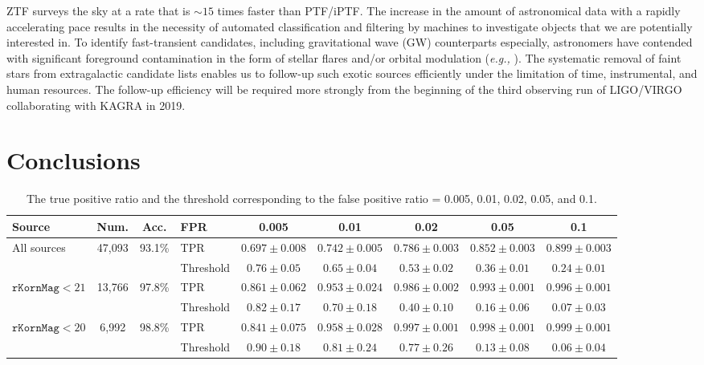 \documentclass[twocolumn]{aastex62}
\begin{document}
ZTF surveys the sky at a rate that is $\sim15$ times faster than PTF/iPTF. 
The increase in the amount of astronomical data with a rapidly accelerating pace 
results in the necessity of automated classification and filtering by machines to investigate objects 
that we are potentially interested in. 
To identify fast-transient candidates, including gravitational wave (GW) counterparts especially, 
astronomers have contended with significant foreground contamination in the form of stellar flares 
and/or orbital modulation ({\it e.g.,} \citealt{Kulkarni06, Berger12, Kasliwal16}). 
The systematic removal of faint stars from extragalactic candidate lists 
enables us to follow-up such exotic sources efficiently under the limitation of time, instrumental, and human resources. 
The follow-up efficiency will be required more strongly from the beginning of the third observing run of LIGO/VIRGO 
collaborating with KAGRA in 2019. 


\section{Conclusions}

\begin{table}
\begin{center}
\caption{The true positive ratio and the threshold 
corresponding to the false positive ratio = 0.005, 0.01, 0.02, 0.05, and 0.1. }
\label{tbl:fpr}
\begin{tabular}{lcc|lccccc}
\hline\hline
                 Source               & Num. & Acc. & FPR & 0.005 & 0.01 & 0.02 & 0.05 & 0.1 \\ \hline
\multirow{2}{*}{All sources} & \multirow{2}{*}{47,093} & \multirow{2}{*}{93.1\%} & 
                                              TPR  & $0.697 \pm 0.008$ &  $0.742 \pm 0.005$ & $0.786 \pm 0.003$ & $0.852 \pm 0.003$ & $0.899 \pm 0.003$  \\
\multicolumn{1}{l}{}                             & & & Threshold & $0.76 \pm 0.05$ &  $0.65 \pm 0.04$ & $0.53 \pm 0.02$ & $0.36 \pm 0.01$ & $0.24 \pm 0.01$  \\ \hline
\multirow{2}{*}{$\mathtt{rKornMag} < 21$} & \multirow{2}{*}{13,766} & \multirow{2}{*}{97.8\%} & 
                                              TPR  & $0.861 \pm 0.062$ &  $0.953 \pm 0.024$ & $0.986 \pm 0.002$ & $0.993 \pm 0.001$ & $0.996 \pm 0.001$ \\
                                                & & & Threshold & $0.82 \pm 0.17$ &  $0.70 \pm 0.18$ & $0.40 \pm 0.10$ & $0.16 \pm 0.06$ & $0.07 \pm 0.03$   \\ \hline
\multirow{2}{*}{$\mathtt{rKornMag} < 20$}  & \multirow{2}{*}{6,992}& \multirow{2}{*}{98.8\%} & 
                                              TPR  & $0.841 \pm 0.075$ &  $0.958 \pm 0.028$ & $0.997 \pm 0.001$ & $0.998 \pm 0.001$ & $0.999 \pm 0.001$  \\
                                                 & &  & Threshold & $0.90 \pm 0.18$ &  $0.81 \pm 0.24$ & $0.77 \pm 0.26$ & $0.13 \pm 0.08$ & $0.06 \pm 0.04$ \\ \hline
\end{tabular}
\end{center}
\end{table}
\end{document}
